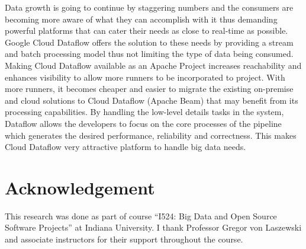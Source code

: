 \documentclass[9pt,twocolumn,twoside]{styles/osajnl}
\begin{document}
Data growth is going to continue by staggering numbers and the
consumers are becoming more aware of what they can accomplish with it
thus demanding powerful platforms that can cater their needs as close
to real-time as possible. Google Cloud Dataflow offers the solution to
these needs by providing a stream and batch processing model thus not
limiting the type of data being consumed. Making Cloud Dataflow
available as an Apache Project increases reachability and enhances
visibility to allow more runners to be incorporated to project. With
more runners, it becomes cheaper and easier to migrate the existing
on-premise and cloud solutions to Cloud Dataflow (Apache Beam) that
may benefit from its processing capabilities.  By handling the
low-level details tasks in the system, Dataflow allows the developers
to focus on the core processes of the pipeline which generates the
desired performance, reliability and correctness. This makes Cloud
Dataflow very attractive platform to handle big data needs.

\section{Acknowledgement}

This research was done as part of course “I524: Big Data and Open
Source Software Projects” at Indiana University. I thank Professor
Gregor von Laszewski and associate instructors for their support
throughout the course.



 
\end{document}
